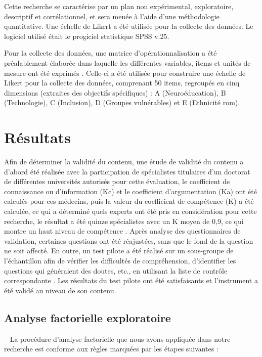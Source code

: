 \documentclass[french]{textolivre}
\begin{document}
Cette recherche se caractérise par un plan non expérimental, exploratoire, descriptif et corrélationnel, et sera menée à l'aide d'une méthodologie quantitative. Une échelle de Likert a été utilisée pour la collecte des données. Le logiciel utilisé était le progiciel statistique SPSS v.25.

Pour la collecte des données, une matrice d'opérationnalisation a été préalablement élaborée dans laquelle les différentes variables, items et unités de mesure ont été exprimés \cite{mejia_metodologiinvestigacion_2005}. Celle-ci a été utilisée pour construire une échelle de Likert pour la collecte des données, comprenant 50 items, regroupés en cinq dimensions (extraites des objectifs spécifiques) : A (Neuroéducation), B (Technologie), C (Inclusion), D (Groupes vulnérables) et E (Ethnicité rom).

\section{Résultats}\label{sec-conduta}
Afin de déterminer la validité du contenu, une étude de validité du contenu a d'abord été réalisée avec la participation de spécialistes titulaires d'un doctorat de différentes universités \cite{malla_prevision_1978} autorisés pour cette évaluation, le coefficient de connaissance ou d'information (Kc) et le coefficient d'argumentation (Ka) ont été calculés pour ces médecins, puis la valeur du coefficient de compétence (K) a été calculée, ce qui a déterminé quels experts ont été pris en considération pour cette recherche, le résultat a été quinze spécialistes avec un K moyen de 0,9, ce qui montre un haut niveau de compétence \cite{mengual_importancia_2011}. Après analyse des questionnaires de validation, certaines questions ont été réajustées, sans que le fond de la question ne soit affecté. En outre, un test pilote a été réalisé sur un sous-groupe de l'échantillon afin de vérifier les difficultés de compréhension, d'identifier les questions qui généraient des doutes, etc., en utilisant la liste de contrôle correspondante \cite{iraossi_poder_2006}. Les résultats du test pilote ont été satisfaisants et l'instrument a été validé au niveau de son contenu.
 
\subsection{Analyse factorielle exploratoire}
 
La procédure d'analyse factorielle que nous avons appliquée dans notre recherche est conforme aux règles marquées par les étapes suivantes \cite{diaz-de-rada_tecnicas_2002}:
\end{document}
